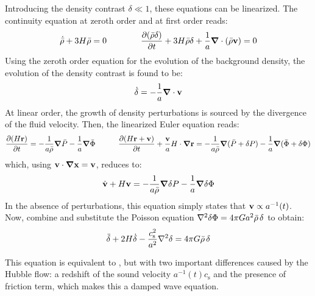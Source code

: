 Introducing the density contrast $ \delta \ll 1 $, these equations can be linearized\footnotemark. The continuity equation at zeroth order and at first order reads:
\begin{equation*}
  \dot{\bar \rho} + 3 H \bar \rho = 0
  \qquad \qquad
  \frac{\partial (\bar{\rho} \delta)}{\partial t} + 3 H \bar{\rho} \delta + \frac{1}{a} \boldsymbol{\nabla}\cdot (\bar{\rho} \mathbf{v}) = 0
\end{equation*}
Using the zeroth order equation for the evolution of the background density, the evolution of the density contrast is found to be:
\begin{equation}
  \dot \delta = - \frac{1}{a} \boldsymbol{\nabla}\cdot \mathbf{v}
  \label{eq:density-contrast}
\end{equation}
At linear order, the growth of density perturbations is sourced by the divergence of the fluid velocity. Then, the linearized Euler equation reads:
\begin{equation*}
  \frac{\partial (H \mathbf{r})}{\partial t} = - \frac{1}{a \bar{\rho}} \boldsymbol{\nabla} \bar P - \frac{1}{a} \boldsymbol{\nabla} \bar \Phi
  \qquad \quad
  \frac{\partial (H \mathbf{r} + \mathbf{v})}{\partial t} + \frac{\mathbf{v}}{a} H \cdot \boldsymbol{\nabla} \mathbf{r} = - \frac{1}{a \bar \rho} \boldsymbol{\nabla} (\bar P + \delta P) - \frac{1}{a} \boldsymbol{\nabla} (\bar \Phi + \delta \Phi)
\end{equation*}
which, using $ \mathbf{v} \cdot \boldsymbol{\nabla} \mathbf{x} = \mathbf{v} $, reduces to:
\begin{equation}
  \dot{\mathbf{v}} + H \mathbf{v} = - \frac{1}{a \bar \rho} \boldsymbol{\nabla} \delta P - \frac{1}{a} \boldsymbol{\nabla} \delta \Phi
  \label{eq:peculiar-velocity}
\end{equation}
In the absence of perturbations, this equation simply states that $ \mathbf{v} \propto a^{-1}(t) $. Now, combine  and substitute the Poisson equation $ \nabla^2 \delta \Phi = 4\pi G a^2 \bar \rho \, \delta $ to obtain:
\begin{equation}
  \ddot{\delta} + 2 H \dot{\delta} - \frac{c_\text{s}^2}{a^2} \nabla^2 \delta = 4\pi G \bar \rho \, \delta
  \label{eq:wave-newton}
\end{equation}


This equation is equivalent to , but with two important differences caused by the Hubble flow: a redshift of the sound velocity $ a^{-1}(t) c_\text{s} $ and the presence of friction term, which makes this a damped wave equation.

